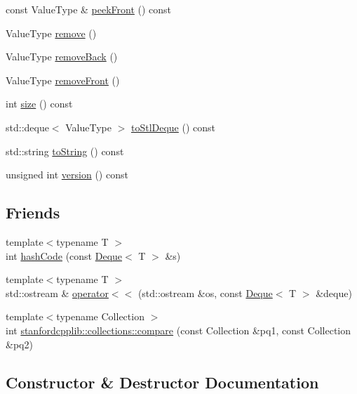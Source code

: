 \begin{DoxyCompactItemize}
\item 
const Value\+Type \& \mbox{\hyperlink{classDeque_a7bac5f26f5665291d89e8de29496ee79}{peek\+Front}} () const
\item 
Value\+Type \mbox{\hyperlink{classDeque_a025ec97fa5b04552f5ad0902c1f02ac1}{remove}} ()
\item 
Value\+Type \mbox{\hyperlink{classDeque_af7878e9c2f67e06cbae525e9fa77e38e}{remove\+Back}} ()
\item 
Value\+Type \mbox{\hyperlink{classDeque_a02453aa96e93c38ca4c1d176307c8a63}{remove\+Front}} ()
\item 
int \mbox{\hyperlink{classDeque_af9593d4a5ff4274efaf429cb4f9e57cc}{size}} () const
\item 
std\+::deque$<$ Value\+Type $>$ \mbox{\hyperlink{classDeque_a577546d159bb5d7237f506789f2beafd}{to\+Stl\+Deque}} () const
\item 
std\+::string \mbox{\hyperlink{classDeque_a1fe5121d6528fdea3f243321b3fa3a49}{to\+String}} () const
\item 
unsigned int \mbox{\hyperlink{classDeque_a0aa696ccb72cbf928535d6b646bac1aa}{version}} () const
\end{DoxyCompactItemize}
\subsection*{Friends}
\begin{DoxyCompactItemize}
\item 
{\footnotesize template$<$typename T $>$ }\\int \mbox{\hyperlink{classDeque_aa9e4a693df95cedc23d501cce865d9af}{hash\+Code}} (const \mbox{\hyperlink{classDeque}{Deque}}$<$ T $>$ \&s)
\item 
{\footnotesize template$<$typename T $>$ }\\std\+::ostream \& \mbox{\hyperlink{classDeque_a369ddf8d137598b1bf09d82fbcae587c}{operator$<$$<$}} (std\+::ostream \&os, const \mbox{\hyperlink{classDeque}{Deque}}$<$ T $>$ \&deque)
\item 
{\footnotesize template$<$typename Collection $>$ }\\int \mbox{\hyperlink{classDeque_ac12ad2761ec7037f8866b726424a81e2}{stanfordcpplib\+::collections\+::compare}} (const Collection \&pq1, const Collection \&pq2)
\end{DoxyCompactItemize}


\subsection{Constructor \& Destructor Documentation}
\mbox{\label{classDeque_a41ebad440badfe713f3ffbbec2eac93f}} 
